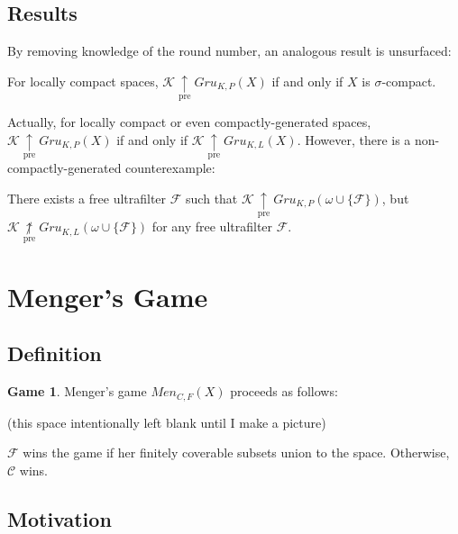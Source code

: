 \documentclass{beamer}
\theoremstyle{definition}
\newtheorem{game}[theorem]{Game}
\newcommand{\prewin}{\underset{\text{pre}}{\uparrow}}
\newcommand{\notprewin}{\underset{\text{pre}}{\not\uparrow}}
\newcommand{\gruKPGame}[1]{Gru_{K,P}\left({#1}\right)}
\newcommand{\gruKLGame}[1]{Gru_{K,L}\left({#1}\right)}
\newcommand{\menGame}[1]{Men_{C,F}\left({#1}\right)}
\newcommand{\<}{\langle}
\renewcommand{\>}{\rangle}
\newcommand{\mc}[1]{\mathcal{#1}}
\newcommand{\pl}[1]{\mathscr{#1}}
\begin{document}
\subsection{Results}

\begin{frame}
  By removing knowledge of the round number, an analogous result is
  unsurfaced:

  \begin{theorem}
    For locally compact spaces, $\pl K\prewin\gruKPGame{X}$ if and only if
    $X$ is $\sigma$-compact.
  \end{theorem}

  \pause

  Actually, for locally compact or even compactly-generated spaces,
  $\pl K\prewin\gruKPGame{X}$ if and only if $\pl K\prewin\gruKLGame{X}$.
  However, there is a non-compactly-generated counterexample:

  \begin{theorem}
    There exists a free ultrafilter $\mc F$ such that
    $\pl K \prewin\gruKPGame{\omega\cup\{\mc F\}}$, but
    $\pl K \notprewin\gruKLGame{\omega\cup\{\mc F\}}$ for any free
    ultrafilter $\mc F$.
  \end{theorem}
\end{frame}





\section{Menger's Game}

\subsection{Definition}

\begin{frame}
  \small
  \begin{game}
  Menger's game $\menGame{X}$ proceeds as follows:

  (this space intentionally left blank until I make a picture)

  $\pl F$ wins the game if her finitely coverable subsets
  union to the space. Otherwise, $\pl C$  wins.
  \end{game}
\end{frame}

\subsection{Motivation}
\end{document}
